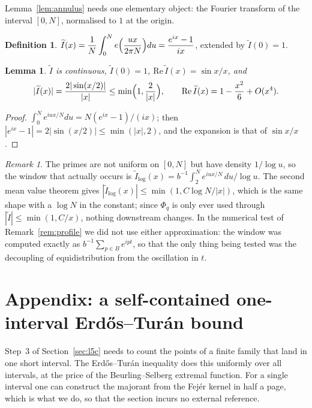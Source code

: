 \documentclass[11pt,a4paper]{article}
\theoremstyle{plain}
\newtheorem{lemma}[theorem]{Lemma}
\theoremstyle{definition}
\newtheorem{definition}[theorem]{Definition}
\theoremstyle{remark}
\newtheorem{remark}[theorem]{Remark}
\begin{document}
Lemma~\ref{lem:annulus} needs one elementary object: the Fourier transform of
the interval $[0,N]$, normalised to $1$ at the origin.

\begin{definition}
$\displaystyle\widetilde I(x)=\frac1N\int_0^{N}e\Bigl(\frac{ux}{2\pi N}\Bigr)du
 =\frac{e^{ix}-1}{ix}$, extended by $\widetilde I(0)=1$.
\end{definition}

\begin{lemma}\label{lem:window}
$\widetilde I$ is continuous, $\widetilde I(0)=1$,
$\mathrm{Re}\,\widetilde I(x)=\sin x/x$, and
\[
  |\widetilde I(x)|=\frac{2|\sin(x/2)|}{|x|}\le\min\Bigl(1,\frac{2}{|x|}\Bigr),
  \qquad
  \mathrm{Re}\,\widetilde I(x)=1-\frac{x^{2}}{6}+O(x^{4}) .
\]
\end{lemma}

\begin{proof}
$\int_0^{N}e^{iux/N}du=N(e^{ix}-1)/(ix)$; then
$|e^{ix}-1|=2|\sin(x/2)|\le\min(|x|,2)$, and the expansion is that of
$\sin x/x$.
\end{proof}

\begin{remark}
The primes are not uniform on $[0,N]$ but have density $1/\log u$, so the
window that actually occurs is
$\widetilde I_{\log}(x)=b^{-1}\int_2^{N}e^{iux/N}\,du/\log u$. The second mean
value theorem gives $|\widetilde I_{\log}(x)|\le\min(1,C\log N/|x|)$, which is
the same shape with a $\log N$ in the constant; since $\Phi_q$ is only ever used
through $|\widetilde I|\le\min(1,C/x)$, nothing downstream changes. In the
numerical test of Remark~\ref{rem:profile} we did not use either approximation:
the window was computed exactly as $b^{-1}\sum_{p\in B}e^{ipt}$, so that the
only thing being tested was the decoupling of equidistribution from the
oscillation in $t$.
\end{remark}

\section{Appendix: a self-contained one-interval Erd\H{o}s--Tur\'an bound}
\label{sec:fejer}

Step~3 of Section~\ref{sec:l5c} needs to count the points of a finite family
that land in one short interval. The Erd\H{o}s--Tur\'an inequality does this
uniformly over all intervals, at the price of the Beurling--Selberg extremal
function. For a single interval one can construct the majorant from the Fej\'er
kernel in half a page, which is what we do, so that the section incurs no
external reference.
\end{document}
